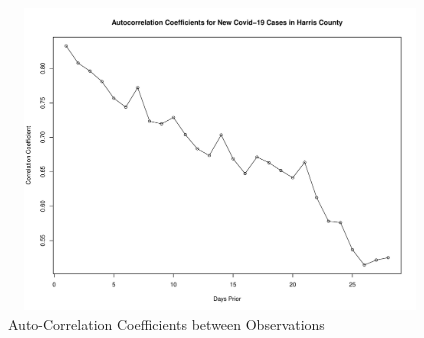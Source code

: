 \documentclass{article}
\begin{document}
\begin{figure}[h]
    \centering
    \includegraphics[width=12cm,height=8cm]{graphs/ac_coeff.pdf}
    \caption{Auto-Correlation Coefficients between Observations}
    \label{autocorr}
\end{figure}
\end{document}
